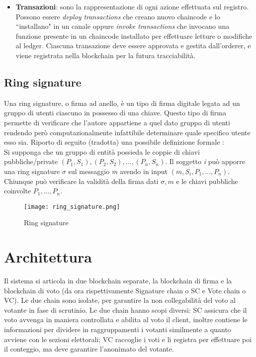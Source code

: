 \begin{itemize}
				\item \textbf{Transazioni}: sono la rappresentazione di ogni azione effettuata sul registro. Possono essere \emph{deploy transactions} che creano nuovo chaincode e lo ``installano" in un canale oppure \emph{invoke transactions} che invocano una funzione presente in un chaincode installato per effettuare letture o modifiche al ledger. Ciascuna transazione deve essere approvata e gestita dall'orderer, e viene registrata nella blockchain per la futura tracciabilità.
			\end{itemize}
		
	\subsection{Ring signature}
		Una ring signature, o firma ad anello, è un tipo di firma digitale legata ad un gruppo di utenti ciascuno in possesso di una chiave. Questo tipo di firma permette di verificare che l'autore appartiene a quel dato gruppo di utenti rendendo però computazionalmente infattibile determinare quale specifico utente esso sia. Riporto di seguito (tradotta) una possibile definizione formale \cite{ring_signature}: \\
		Si supponga che un gruppo di entità possieda le coppie di chiavi pubbliche/private $(P_1, S_1), (P_2, S_2), ..., (P_n, S_n)$. Il soggetto \emph{i} può apporre una ring signature $\sigma$ sul messaggio \emph{m} avendo in input $(m, S_i, P_1, ..., P_n)$. Chiunque può verificare la validità della firma dati $\sigma, m$ e le chiavi pubbliche coinvolte $P_1, ..., P_n$.
		\begin{figure}[ht]
			\centering
			\texttt{[image: ring\_signature.png]}
			\caption{Ring signature}
			\label{fig:ring_signature}
		\end{figure}


\section{Architettura}
	Il sistema si articola in due blockchain separate, la blockchain di firma e la blockchain di voto (da ora rispettivamente Signature chain o SC e Vote chain o VC). Le due chain sono isolate, per garantire la non collegabilità del voto al votante in fase di scrutinio.
	Le due chain hanno scopi diversi: SC assicura che il voto avvenga in maniera controllata e abilita al voto il client, inoltre contiene le informazioni per dividere in raggruppamenti i votanti similmente a quanto avviene con le sezioni elettorali; VC raccoglie i voti e li registra per effettuare poi il conteggio, ma deve garantire l’anonimato del votante.
	

